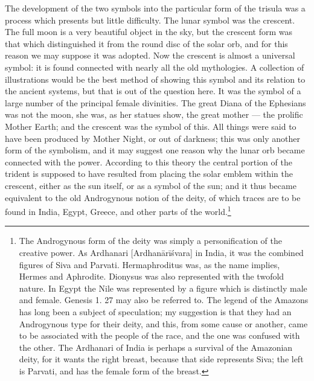 \documentclass[a4paper, 11pt, oneside, english, landscape, twocolumn]{article}
\begin{document}
The development of the two symbols into the particular form of the trisula was a process which presents but little difficulty. The lunar symbol was the crescent. The full moon is a very beautiful object in the sky, but the crescent form was that which distinguished it from the round disc of the solar orb, and for this reason we may suppose it was adopted. Now the crescent is almost a universal symbol: it is found connected with nearly all the old mythologies. A collection of illustrations would be the best method of showing this symbol and its relation to the ancient systems, but that is out of the question here. It was the symbol of a large number of the principal female divinities. The great Diana of the Ephesians was not the moon, she was, as her statues show, the great mother --- the prolific Mother Earth; and the crescent was the symbol of this. All things were said to have been produced by Mother Night, or out of darkness; this was only another form of the symbolism, and it may suggest one reason why the lunar orb became connected with the power. According to this theory the central portion of the trident is supposed to have resulted from placing the solar emblem within the crescent, either as the sun itself, or as a symbol of the sun; and it thus became equivalent to the old Androgynous notion of the deity, of which traces are to be found in India, Egypt, Greece, and other parts of the world.\footnote{The Androgynous form of the deity was simply a personification of the creative power. As Ardhanari [Ardhanārīśvara] in India, it was the combined figures of Siva and Parvati. Hermaphroditus was, as the name implies, Hermes and Aphrodite. Dionysus was also represented with the twofold nature. In Egypt the Nile was represented by a figure which is distinctly male and female. Genesis 1. 27 may also be referred to. The legend of the Amazons has long been a subject of speculation; my suggestion is that they had an Androgynous type for their deity, and this, from some cause or another, came to be associated with the people of the race, and the one was confused with the other. The Ardhanari of India is perhaps a survival of the Amazonian deity, for it wants the right breast, because that side represents Siva; the left is Parvati, and has the female form of the breast.}
\end{document}
